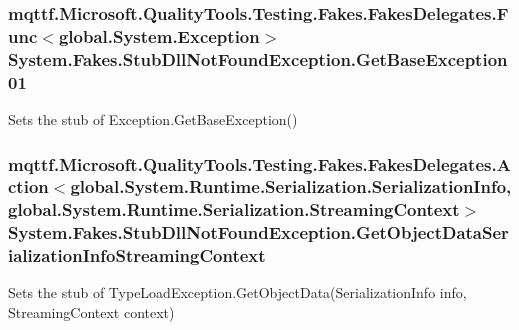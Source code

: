 \hypertarget{class_system_1_1_fakes_1_1_stub_dll_not_found_exception_a7d6d101ce5af833282493d849c164971}{
\subsubsection[{Get\-Base\-Exception01}]{\setlength{\rightskip}{0pt plus 5cm}mqttf.\-Microsoft.\-Quality\-Tools.\-Testing.\-Fakes.\-Fakes\-Delegates.\-Func$<$global.\-System.\-Exception$>$ System.\-Fakes.\-Stub\-Dll\-Not\-Found\-Exception.\-Get\-Base\-Exception01}}\label{class_system_1_1_fakes_1_1_stub_dll_not_found_exception_a7d6d101ce5af833282493d849c164971}


Sets the stub of Exception.\-Get\-Base\-Exception()

\hypertarget{class_system_1_1_fakes_1_1_stub_dll_not_found_exception_accd7e8a4ed608953062d62c0262a1c9b}{
\subsubsection[{Get\-Object\-Data\-Serialization\-Info\-Streaming\-Context}]{\setlength{\rightskip}{0pt plus 5cm}mqttf.\-Microsoft.\-Quality\-Tools.\-Testing.\-Fakes.\-Fakes\-Delegates.\-Action$<$global.\-System.\-Runtime.\-Serialization.\-Serialization\-Info, global.\-System.\-Runtime.\-Serialization.\-Streaming\-Context$>$ System.\-Fakes.\-Stub\-Dll\-Not\-Found\-Exception.\-Get\-Object\-Data\-Serialization\-Info\-Streaming\-Context}}\label{class_system_1_1_fakes_1_1_stub_dll_not_found_exception_accd7e8a4ed608953062d62c0262a1c9b}


Sets the stub of Type\-Load\-Exception.\-Get\-Object\-Data(\-Serialization\-Info info, Streaming\-Context context)

